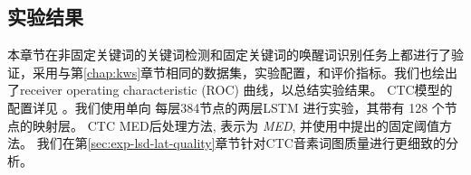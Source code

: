 %
%

\subsection{实验结果}

本章节在非固定关键词的关键词检测和固定关键词的唤醒词识别任务上都进行了验证，采用与第\ref{chap:kws}章节相同的数据集，实验配置，和评价指标。我们也绘出了receiver operating characteristic (ROC) 曲线，以总结实验结果。
CTC模型的配置详见 \cite{7736093}。我们使用单向 每层384节点的两层LSTM 进行实验，其带有 128 个节点的映射层。
CTC MED后处理方法, 表示为 {\em{MED}}, 并使用\cite{7736093}中提出的固定阈值方法。
我们在第\ref{sec:exp-lsd-lat-quality}章节针对CTC音素词图质量进行更细致的分析。

